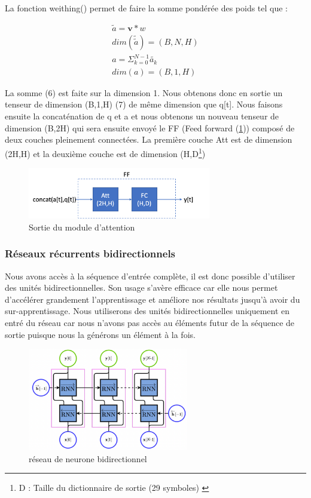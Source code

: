         La fonction weithing() permet de faire la somme pondérée des poids tel que :
        
        \begin{align}
            \tilde{a}=\mathbf{v}*w \\
            dim(\tilde{\tilde{a}})=(B,N,H) \\
            a=\Sigma_{k=0}^{N-1} \tilde{a_{k}}\\
            dim(a)=(B,1,H)
        \end{align}
        
        La somme (6) est faite sur la dimension 1. Nous obtenons donc en sortie un tenseur de dimension (B,1,H) (7) de même dimension que q[t]. Nous faisons ensuite la concaténation de q et a et nous obtenons un nouveau tenseur de dimension (B,2H) qui sera ensuite envoyé le FF (Feed forward (\ref{fig:Figure 7  })) composé de deux couches pleinement connectées. La première couche Att est de dimension (2H,H) et la deuxième couche est de dimension (H,D\footnote{D : Taille du dictionnaire de sortie (29 symboles) \label{D}})
        
        \begin{figure}[!ht]
            \centering
            \includegraphics[width=80mm]{sections/images/architecture/sortie_att.png}
            \caption{Sortie du module d'attention}
            \label{fig:Figure 7  }
        \end{figure}
        
    \subsubsection{Réseaux récurrents bidirectionnels}
        Nous avons accès à la séquence d'entrée complète, il est donc possible d'utiliser des unités bidirectionnelles. Son usage s'avère efficace car elle nous permet d'accélérer grandement l'apprentissage et améliore nos résultats jusqu'à avoir du sur-apprentissage. Nous utiliserons des unités bidirectionnelles uniquement en entré du réseau car nous n'avons pas accès au éléments futur de la séquence de sortie puisque nous la générons un élément à la fois.
        
        \begin{figure}[!ht]
            \centering
            \includegraphics[width=70mm]{sections/images/architecture/bidirection.png}
            \caption{réseau de neurone bidirectionnel}
            \label{fig:Figure 8  }
        \end{figure}
        
